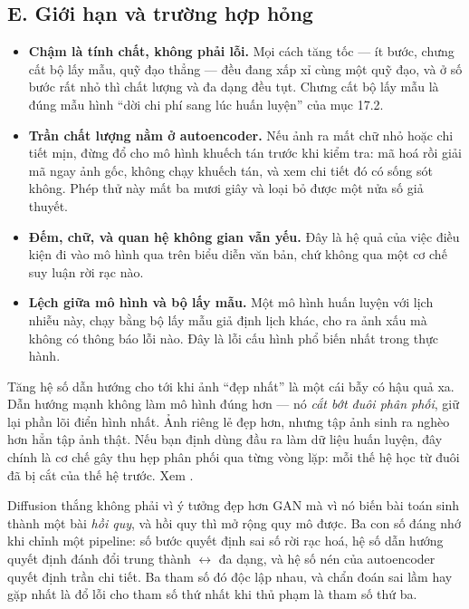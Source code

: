 \documentclass[../../../deep_learning.tex]{subfiles}
\begin{document}
\subsection{E. Giới hạn và trường hợp hỏng}
\begin{itemize}
\item \textbf{Chậm là tính chất, không phải lỗi.} Mọi cách tăng tốc --- ít bước, chưng cất bộ lấy mẫu, quỹ đạo thẳng --- đều đang xấp xỉ cùng một quỹ đạo, và ở số bước rất nhỏ thì chất lượng và đa dạng đều tụt. Chưng cất bộ lấy mẫu là đúng mẫu hình ``dời chi phí sang lúc huấn luyện'' của mục 17.2.
\item \textbf{Trần chất lượng nằm ở autoencoder.} Nếu ảnh ra mất chữ nhỏ hoặc chi tiết mịn, đừng đổ cho mô hình khuếch tán trước khi kiểm tra: mã hoá rồi giải mã ngay ảnh gốc, không chạy khuếch tán, và xem chi tiết đó có sống sót không. Phép thử này mất ba mươi giây và loại bỏ được một nửa số giả thuyết.
\item \textbf{Đếm, chữ, và quan hệ không gian vẫn yếu.} Đây là hệ quả của việc điều kiện đi vào mô hình qua  trên biểu diễn văn bản, chứ không qua một cơ chế suy luận rời rạc nào.
\item \textbf{Lệch giữa mô hình và bộ lấy mẫu.} Một mô hình huấn luyện với lịch nhiễu này, chạy bằng bộ lấy mẫu giả định lịch khác, cho ra ảnh xấu mà không có thông báo lỗi nào. Đây là lỗi cấu hình phổ biến nhất trong thực hành.
\end{itemize}

\begin{cambay}
Tăng hệ số dẫn hướng cho tới khi ảnh ``đẹp nhất'' là một cái bẫy có hậu quả xa. Dẫn hướng mạnh không làm mô hình đúng hơn --- nó \emph{cắt bớt đuôi phân phối}, giữ lại phần lõi điển hình nhất. Ảnh riêng lẻ đẹp hơn, nhưng tập ảnh sinh ra nghèo hơn hẳn tập ảnh thật. Nếu bạn định dùng đầu ra làm dữ liệu huấn luyện, đây chính là cơ chế gây thu hẹp phân phối qua từng vòng lặp: mỗi thế hệ học từ đuôi đã bị cắt của thế hệ trước. Xem .
\end{cambay}

\begin{cannho}
Diffusion thắng không phải vì ý tưởng đẹp hơn GAN mà vì nó biến bài toán sinh thành một bài \emph{hồi quy}, và hồi quy thì mở rộng quy mô được. Ba con số đáng nhớ khi chỉnh một pipeline: số bước quyết định sai số rời rạc hoá, hệ số dẫn hướng quyết định đánh đổi trung thành \(\leftrightarrow\) đa dạng, và hệ số nén của autoencoder quyết định trần chi tiết. Ba tham số đó độc lập nhau, và chẩn đoán sai lầm hay gặp nhất là đổ lỗi cho tham số thứ nhất khi thủ phạm là tham số thứ ba. 
\end{cannho}
\end{document}
